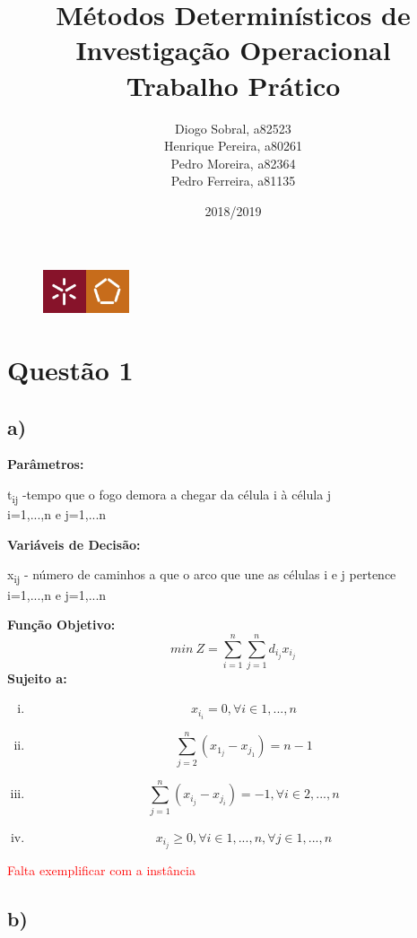 \documentclass[11pt]{article} %
\title{Métodos Determinísticos de Investigação Operacional \\ \large Trabalho Prático}
\author{Diogo Sobral, a82523 \\ Henrique Pereira, a80261 \\ Pedro Moreira, a82364 \\ Pedro Ferreira, a81135}
\date{2018/2019}
\begin{document}
\maketitle

\begin{figure}[!b]
    \centering
    \includegraphics[width=1in]{um_eeng.jpg}
\end{figure}

\newpage

\section*{Questão 1}
\subsection*{a)}
\textbf{Parâmetros:}  \\
\begin{center}
t\textsubscript{ij} -tempo que o fogo demora a chegar da célula i à célula j\\
i=1,...,n e j=1,...n \\
\end{center}
\textbf{Variáveis de Decisão:} \\
\begin{center}
x\textsubscript{ij} - número de caminhos a que o arco que une as células i e j pertence\\
i=1,...,n e j=1,...n \\
\end{center}
\textbf{Função Objetivo:} \\
$$min \ Z = \sum_{i=1}^{n} \sum_{j=1}^{n} d_i_jx_i_j$$
\textbf{Sujeito a:}
\begin{enumerate}[(i)]
\item $$x_i_i = 0, \forall i \in 1,...,n$$
\item $$\sum_{j=2}^{n} (x_1_j - x_j_1) = n-1$$
\item $$\sum_{j=1}^{n} (x_i_j - x_j_i) = -1, \forall i \in 2,...,n $$
\item $$x_i_j \geq 0, \forall i \in 1,...,n , \forall j \in 1,...,n$$
\end{enumerate}

\textcolor{red}{Falta exemplificar com a instância}

\subsection*{b)}
\end{document}
